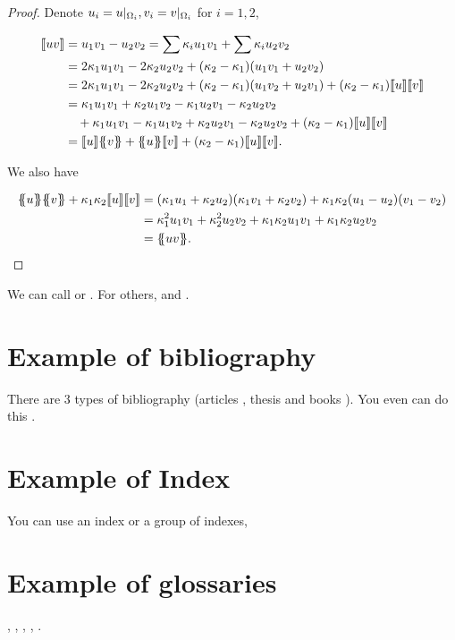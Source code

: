 \documentclass[../main.tex]{subfiles}
\begin{document}
\begin{proof}
  Denote $u_i=u\vert_{\Omega_i}, v_i=v\vert_{\Omega_i}$ for $i=1,2$, 

  \begin{align*}
    \ssb{uv} &= u_1v_1 - u_2v_2
      = \sum \kap_i u_1v_1 + \sum\kap_i u_2v_2 \\
      &= 2\kap_1 u_1v_1 - 2\kap_2 u_2v_2 
        + (\kap_2 - \kap_1)(u_1v_1 + u_2v_2) \\
      &= 2\kap_1 u_1v_1 - 2\kap_2 u_2v_2 
        + (\kap_2 - \kap_1)(u_1v_2 + u_2v_1)
        + (\kap_2 - \kap_1)\ssb{u}\ssb{v} \\
      &= \kap_1u_1v_1 + \kap_2u_1v_2 -\kap_1u_2v_1 -\kap_2u_2v_2 \\
        & \quad + \kap_1u_1v_1 - \kap_1u_1v_2 + \kap_2u_2v_1 - \kap_2u_2v_2 + (\kap_2 - \kap_1)\ssb{u}\ssb{v} \\
      &= \ssb{u}\bbrace{v} + \bbrace{u}\ssb{v} + (\kap_2 - \kap_1)\ssb{u}\ssb{v}.
  \end{align*}

  We also have

  \begin{align*}
    \bbrace{u}\bbrace{v} + \kap_1\kap_2 \ssb{u}\ssb{v}
      &= (\kap_1u_1 + \kap_2u_2)(\kap_1v_1 + \kap_2v_2)
        + \kap_1\kap_2(u_1-u_2)(v_1-v_2) \\
      &= \kap_1^2u_1v_1 + \kap_2^2u_2v_2 
        + \kap_1\kap_2 u_1v_1 + \kap_1\kap_2 u_2v_2 \\
      &= \bbrace{uv}.
  \end{align*}
\end{proof}

We can call  or . For others,  and .

\section{Example of bibliography}

There are 3 types of bibliography (articles \cite{Eymard2010,renard2009}, thesis \cite{Engwer2009,szomolayThesis} and books \cite{LeDret2013,Durr2009}). You even can do this \cite[Section~3]{George2000}.

\section{Example of Index}

You can use an index or a group of indexes, 

\section{Example of glossaries}

, , , , .
\end{document}
